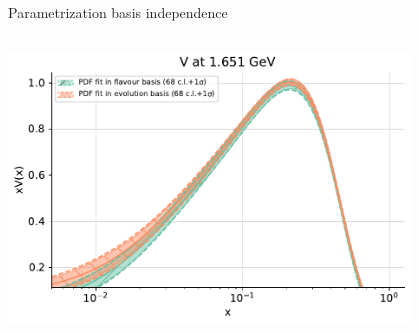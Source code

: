 \documentclass[aspectratio=169,9pt]{beamer}
\begin{document}
\begin{frame}{Parametrization basis independence}
    \begin{columns}
        \begin{column}[T]{0.48\textwidth}
        \vspace*{0pt}%
	        \begin{center}
	            \includegraphics[width=0.8\textwidth]{flavour_evolution_V} \\
	        \end{center}


\end{column}
\end{columns}
\end{frame}
\end{document}
